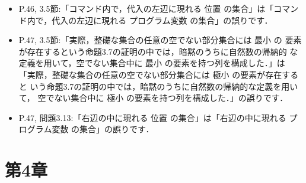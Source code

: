\documentclass[12pt,titlepage,twoside,openright,dvipdfmx]{jsbook}
\newcommand\old[1]{%
  \textcolor[rgb]{1.0,0.25,0.1}{#1}%
  }
\newcommand\new[1]{%
  \textcolor[rgb]{0,0.55,1.0}{#1}%
  }
\theoremstyle{definition}
\begin{document}
\begin{itemize}
\[{      &
      \infer
      {\tuple{\mathbf{while\ true\ do}\ c,\sigma''}\rightarrow\sigma'}
      {\vdots}
    }
  \]
  は
  \[
    d =
    \infer
    {\tuple{\mathbf{while\ true\ do}\ \Cskip, \sigma}\rightarrow \sigma'}
    {
      \infer
      {\tuple{\mathbf{true},\sigma}\rightarrow\mathbf{true}}
      {\vdots}
      &
      \infer
      {\tuple{\new{\Cskip},\sigma}\rightarrow\sigma}
      {\vdots}
      &
      \infer
      {\tuple{\mathbf{while\ true\ do}\ \Cskip,\sigma}\rightarrow\sigma'}
      {\vdots}
    }
  \]
  の誤りです．
\item P.46, 3.5節:「コマンド内で，代入の左辺に現れる\old{位置}の集合」は「コマンド内で，代入の左辺に現れる\new{プログラム変数}の集合」の誤りです．
\item P.47, 3.5節:「実際，整礎な集合の任意の空でない部分集合には\old{最小}の
  要素が存在するという命題3.7の証明の中では，暗黙のうちに自然数の帰納的
  な定義を用いて，空でない集合中に\old{最小}の要素を持つ列を構成した．」は
  「実際，整礎な集合の任意の空でない部分集合には\new{極小}の要素が存在すると
  いう命題3.7の証明の中では，暗黙のうちに自然数の帰納的な定義を用いて，
  空でない集合中に\new{極小}の要素を持つ列を構成した．」の誤りです．
\item P.47, 問題3.13:「右辺の中に現れる\old{位置}の集合」は「右辺の中に現れる
  \new{プログラム変数}の集合」の誤りです．
\end{itemize}
\fi
\fi
\section*{第4章}
\end{document}
